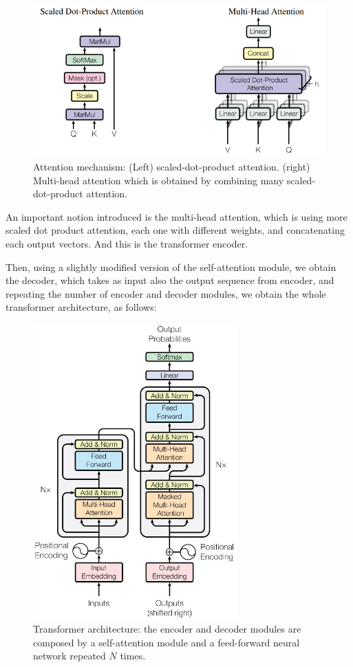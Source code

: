 \begin{figure}[H]
    \centering
    \includegraphics[width=\textwidth]{./images/2_attention}
    \caption[Attention mechanisms]{Attention mechanism: (Left) scaled-dot-product attention. (right) Multi-head attention which is obtained by combining many scaled-dot-product attention.}
    \label{fig:figure-encoder-structure}
\end{figure}

An important notion introduced is the multi-head attention, which is using more scaled dot product attention, each one with different weights, and concatenating each output vectors.
And this is the transformer encoder.

Then, using a slightly modified version of the self-attention module, we obtain the decoder, which takes as input also the output sequence from encoder, and repeating the number of encoder and decoder modules, we obtain the whole transformer architecture, as follows:

\begin{figure}[H]
    \centering
    \includegraphics[width=0.7\textwidth]{./images/2_transformer}
    \caption[Transformer architecture]{Transformer architecture: the encoder and decoder modules are composed by a self-attention module and a feed-forward neural network repeated $N$ times.}
    \label{fig:figure-transformer-architecture}
\end{figure}

